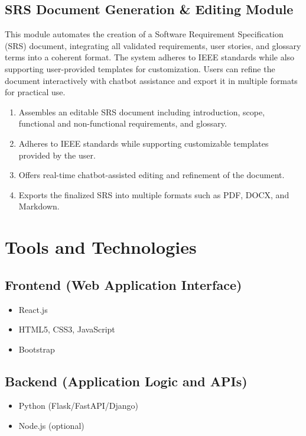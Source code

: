 \subsection{SRS Document Generation \& Editing Module}
This module automates the creation of a Software Requirement Specification (SRS) document, integrating all validated requirements, user stories, and glossary terms into a coherent format. The system adheres to IEEE standards while also supporting user-provided templates for customization. Users can refine the document interactively with chatbot assistance and export it in multiple formats for practical use.  
\begin{enumerate}
    \item Assembles an editable SRS document including introduction, scope, functional and non-functional requirements, and glossary.  
    \item Adheres to IEEE standards while supporting customizable templates provided by the user.  
    \item Offers real-time chatbot-assisted editing and refinement of the document.  
    \item Exports the finalized SRS into multiple formats such as PDF, DOCX, and Markdown.  
\end{enumerate}

\section{Tools and Technologies}

\subsection*{Frontend (Web Application Interface)}
\begin{itemize}
    \item React.js  
    \item HTML5, CSS3, JavaScript 
    \item Bootstrap  
\end{itemize}

\subsection*{Backend (Application Logic and APIs)}
\begin{itemize}
    \item Python (Flask/FastAPI/Django)
    \item Node.js (optional)
\end{itemize}

